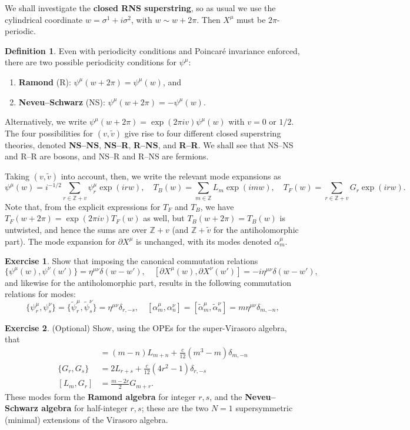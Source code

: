 \documentclass{report}
\theoremstyle{plain}
\theoremstyle{definition}
\newtheorem{definition}[theorem]{Definition}
\newtheorem{exercise}{Exercise}[section]
\theoremstyle{remark}
\newcommand{\di}{\partial}
\newcommand{\bZ}{\mathbb{Z}}
\begin{document}
We shall investigate the {\bf closed RNS superstring}, so as usual we
use the cylindrical coordinate $w = \sigma^1 + i\sigma^2$, with $w
\sim w + 2\pi$. Then $X^\mu$ must be $2\pi$-periodic.

\begin{definition}
  Even with periodicity conditions and Poincar\'e invariance enforced,
  there are two possible periodicity conditions for $\psi^\mu$:
  \begin{enumerate}
  \item {\bf Ramond} (R): $\psi^\mu(w + 2\pi) = \psi^\mu(w)$, and
  \item {\bf Neveu--Schwarz} (NS): $\psi^\mu(w + 2\pi) = -\psi^\mu(w)$.
  \end{enumerate}
  Alternatively, we write $\psi^\mu(w + 2\pi) = \exp(2\pi i v)
  \psi^\mu(w)$ with $v = 0$ or $1/2$. The four possibilities for $(v,
  \tilde{v})$ give rise to four different closed superstring theories,
  denoted {\bf NS--NS}, {\bf NS--R}, {\bf R--NS}, and {\bf R--R}. We
  shall see that NS--NS and R--R are bosons, and NS--R and R--NS are
  fermions.
\end{definition}

Taking $(v, \tilde{v})$ into account, then, we write the relevant mode
expansions as
\[ \psi^\mu(w) = i^{-1/2} \sum_{r \in \bZ + v} \psi_r^\mu \exp(irw), \quad T_B(w) = \sum_{m \in \bZ} L_m \exp(imw), \quad T_F(w) = \sum_{r \in \bZ + v} G_r \exp(irw). \]
Note that, from the explicit expressions for $T_F$ and $T_B$, we have
$T_F(w + 2\pi) = \exp(2\pi iv) T_F(w)$ as well, but $T_B(w + 2\pi) =
T_B(w)$ is untwisted, and hence the sums are over $\bZ + v$ (and $\bZ
+ \tilde{v}$ for the antiholomorphic part). The mode expansion for
$\di X^\mu$ is unchanged, with its modes denoted $\alpha^\mu_m$.

\begin{exercise}
  Show that imposing the canonical commutation relations
  \[ \{\psi^\mu(w), \psi^\nu(w')\} = \eta^{\mu\nu} \delta(w - w'), \quad [\di X^\mu(w), \di X^\nu(w')] = -i \eta^{\mu\nu} \delta(w - w'), \]
  and likewise for the antiholomorphic part, results in the following
  commutation relations for modes:
  \[ \{\psi^\mu_r, \psi^\nu_s\} = \{\tilde{\psi}^\mu_r, \tilde{\psi}^\nu_s\} = \eta^{\mu\nu} \delta_{r,-s}, \quad [\alpha^\mu_m, \alpha^\nu_n] = [\tilde{\alpha}^\mu_m, \tilde{\alpha}^\nu_n] = m\eta^{\mu\nu} \delta_{m,-n}, \]
\end{exercise}

\begin{exercise} (Optional)
  Show, using the OPEs for the super-Virasoro algebra, that
  \begin{align*}
    [L_m, L_n] &= (m - n) L_{m+n} + \frac{c}{12}(m^3 - m)\delta_{m,-n} \\
    \{G_r, G_s\} &= 2 L_{r+s} + \frac{c}{12} (4r^2 - 1) \delta_{r,-s} \\
    [L_m, G_r] &= \frac{m - 2r}{2} G_{m+r}.
  \end{align*}
  These modes form the {\bf Ramond algebra} for integer $r, s$, and
  the {\bf Neveu--Schwarz algebra} for half-integer $r, s$; these are
  the two $N = 1$ supersymmetric (minimal) extensions of the Virasoro
  algebra.
\end{exercise}
\end{document}
